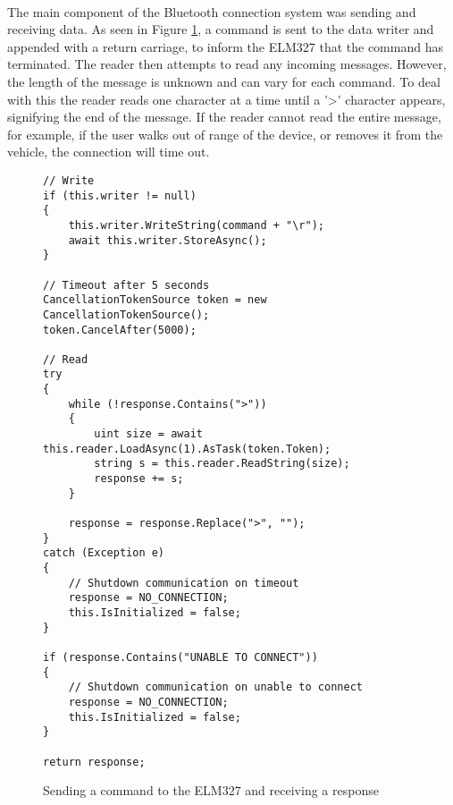 		\paragraph{}{
		The main component of the Bluetooth connection system was sending and receiving data. As seen in Figure \ref{code:BTConnectionSend}, a command is sent to the data writer and appended with a return carriage, to inform the ELM327 that the command has terminated. The reader then attempts to read any incoming messages. However, the length of the  message is unknown and can vary for each command. To deal with this the reader reads one character at a time until a '\textgreater' character appears, signifying the end of the message. If the reader cannot read the entire message, for example, if the user walks out of range of the device, or removes it from the vehicle, the connection will time out.
		}

		\begin{figure}[h]
			\begin{lstlisting}
// Write
if (this.writer != null)
{
    this.writer.WriteString(command + "\r");
	await this.writer.StoreAsync();
}

// Timeout after 5 seconds                
CancellationTokenSource token = new CancellationTokenSource();
token.CancelAfter(5000);

// Read
try
{
	while (!response.Contains(">"))
	{
		uint size = await this.reader.LoadAsync(1).AsTask(token.Token);                        
        string s = this.reader.ReadString(size);
		response += s;
	}
    
    response = response.Replace(">", "");
}
catch (Exception e)
{
	// Shutdown communication on timeout
	response = NO_CONNECTION;
	this.IsInitialized = false;
}                

if (response.Contains("UNABLE TO CONNECT"))
{
	// Shutdown communication on unable to connect
	response = NO_CONNECTION;
    this.IsInitialized = false;
}

return response;
			\end{lstlisting}
			\caption{Sending a command to the ELM327 and receiving a response}
			\label{code:BTConnectionSend}
		\end{figure}		
		
